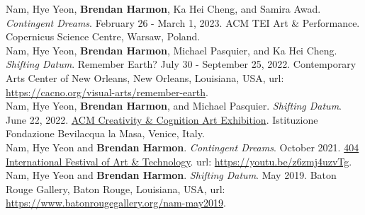 \documentclass[10pt]{developercv} %
\begin{document}
\printbibliography[title={\cvsect{Reports}}, type=report, heading=subbibliography]


\printbibliography[title={\cvsect{Software}}, type=software, heading=subbibliography]


\printbibliography[title={\cvsect{Datasets}}, type=dataset, heading=subbibliography]




Nam, Hye Yeon, \textbf{Brendan Harmon}, Ka Hei Cheng, and Samira Awad. \emph{Contingent Dreams}. February 26 - March 1, 2023. ACM TEI Art \& Performance. Copernicus Science Centre, Warsaw, Poland.\\

Nam, Hye Yeon, \textbf{Brendan Harmon}, Michael Pasquier, and Ka Hei Cheng. \emph{Shifting Datum}. Remember Earth? July 30 - September 25, 2022. Contemporary Arts Center of New Orleans, New Orleans, Louisiana, USA, url: \url{https://cacno.org/visual-arts/remember-earth}.\\

Nam, Hye Yeon, \textbf{Brendan Harmon}, and Michael Pasquier. \emph{Shifting Datum}. June 22, 2022. \href{https://cc.acm.org/2022/}{ACM Creativity \& Cognition Art Exhibition}. Istituzione Fondazione Bevilacqua la Masa, Venice, Italy.\\

Nam, Hye Yeon and \textbf{Brendan Harmon}. \emph{Contingent Dreams}. October 2021. \href{https://www.404festival.com}{404 International Festival of Art \& Technology}. url: \url{https://youtu.be/z6zmj4uzvTg}.\\

Nam, Hye Yeon and \textbf{Brendan Harmon}. \emph{Shifting Datum}. May 2019. Baton Rouge Gallery, Baton Rouge, Louisiana, USA, url: \url{https://www.batonrougegallery.org/nam-may2019}.\\
\end{document}
